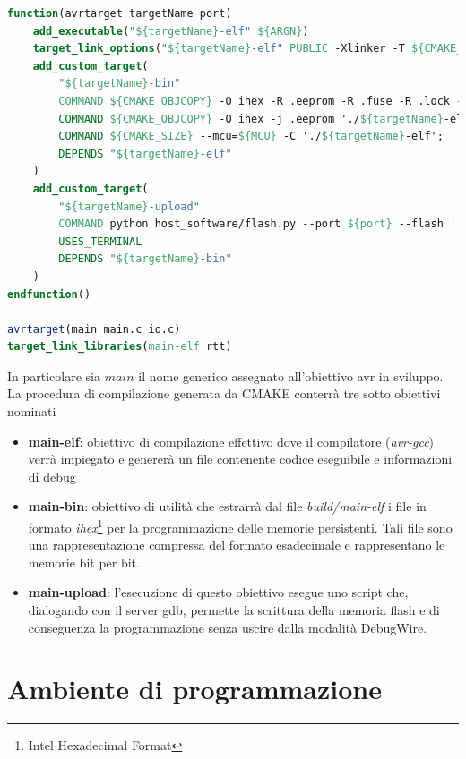 \noindent\begin{minipage}{\textwidth}
    \begin{lstlisting}[language=CMAKE, caption={Definizione di un target di compilazione e upload per un dispositivo AVR}, label=lst:cmake-target]
function(avrtarget targetName port)
    add_executable("${targetName}-elf" ${ARGN})
    target_link_options("${targetName}-elf" PUBLIC -Xlinker -T ${CMAKE_SOURCE_DIR}/cmake/linker/${MCU}.ld)
    add_custom_target(
        "${targetName}-bin" 
        COMMAND ${CMAKE_OBJCOPY} -O ihex -R .eeprom -R .fuse -R .lock -R .signature './${targetName}-elf' './${targetName}.hex';
        COMMAND ${CMAKE_OBJCOPY} -O ihex -j .eeprom './${targetName}-elf' './${targetName}.eeprom.hex';
        COMMAND ${CMAKE_SIZE} --mcu=${MCU} -C './${targetName}-elf';
        DEPENDS "${targetName}-elf"
    )
    add_custom_target(
        "${targetName}-upload"
        COMMAND python host_software/flash.py --port ${port} --flash './${targetName}.hex' --mcu ${MCU}
        USES_TERMINAL
        DEPENDS "${targetName}-bin"
    )
endfunction()

avrtarget(main main.c io.c)
target_link_libraries(main-elf rtt)
    \end{lstlisting}
\end{minipage}

In particolare sia \(main\) il nome generico assegnato all'obiettivo avr in sviluppo. La procedura di compilazione generata da CMAKE conterrà tre sotto obiettivi nominati
\begin{itemize}
    \item \textbf{main-elf}: obiettivo di compilazione effettivo dove il compilatore (\textit{avr-gcc}) verrà impiegato e genererà un file contenente codice eseguibile e informazioni di debug
    \item \textbf{main-bin}: obiettivo di utilità che estrarrà dal file \textit{build/main-elf} i file in formato \textit{ihex}\footnote{Intel Hexadecimal Format} per la programmazione delle memorie persistenti. Tali file sono una rappresentazione compressa del formato esadecimale\cite{site:ihex} e rappresentano le memorie bit per bit.
    \item \textbf{main-upload}: l'esecuzione di questo obiettivo esegue uno script che, dialogando con il server gdb, permette la scrittura della memoria flash e di conseguenza la programmazione senza uscire dalla modalità DebugWire.
\end{itemize}


\section{Ambiente di programmazione}

